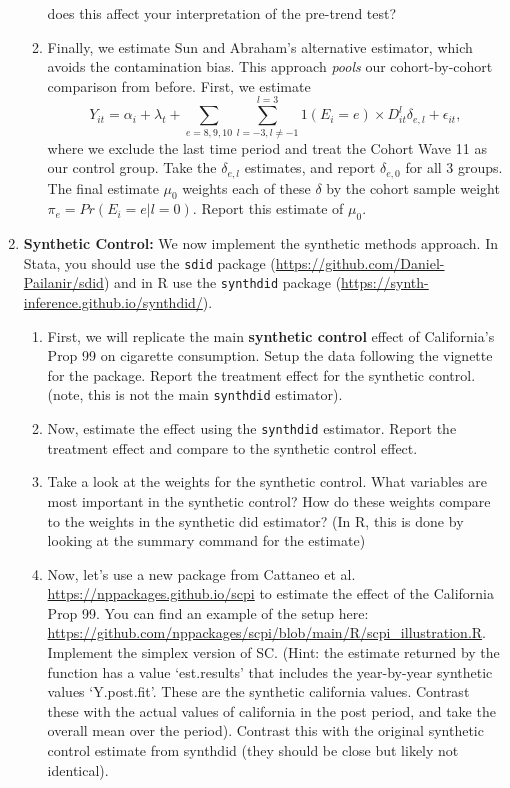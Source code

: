 \documentclass[11pt, a4paper]{article}
\begin{document}
\begin{enumerate}
\begin{enumerate}
        does this affect your interpretation of the pre-trend test?
      \item Finally, we estimate Sun and Abraham's alternative estimator,
        which avoids the contamination bias. This approach \emph{pools}
        our cohort-by-cohort comparison from before. First, we estimate
        \begin{equation}
          Y_{it} = \alpha_{i} + \lambda_{t} + \sum_{e = 8,9,10} \sum_{l =-3, l \not=-1}^{l=3} 1(E_{i} = e) \times D^{l}_{it}\delta_{e,l} + \epsilon_{it},
        \end{equation}
        where we exclude the last time period and treat the Cohort Wave 11
        as our control group. Take the $\delta_{e,l}$ estimates, and
        report $\delta_{e,0}$ for all 3 groups. The final estimate
        $\mu_{0}$ weights each of these $\delta$ by the cohort sample
        weight $\pi_{e} = Pr(E_{i} = e | l = 0)$. Report this estimate of
        $\mu_{0}$.
      \end{enumerate}
    \item \textbf{Synthetic Control:} We now implement the synthetic methods approach. In Stata, you should use the \texttt{sdid} package (\url{https://github.com/Daniel-Pailanir/sdid}) and in R use the \texttt{synthdid} package (\url{https://synth-inference.github.io/synthdid/}). 
    \begin{enumerate}
    \item First, we will replicate the main \textbf{synthetic control} effect of California's Prop 99 on cigarette consumption. Setup the data following the vignette for the package. Report the treatment effect for the synthetic control. (note, this is not the main \texttt{synthdid} estimator). 
    \item Now, estimate the effect using the \texttt{synthdid} estimator. Report the treatment effect and compare to the synthetic control effect.
    \item Take a look at the weights for the synthetic control. What variables are most important in the synthetic control? How do these weights compare to the weights in the synthetic did estimator? (In R, this is done by looking at the summary command for the estimate)
    \item Now, let's use a new package from Cattaneo et al. \url{https://nppackages.github.io/scpi} to estimate the effect of the California Prop 99. You can find an example of the setup here: \url{https://github.com/nppackages/scpi/blob/main/R/scpi_illustration.R}. Implement the simplex version of SC. (Hint: the estimate returned by the function has a value `est.results' that includes the year-by-year synthetic values `Y.post.fit'. These are the synthetic california values. Contrast these with the actual values of california in the post period, and take the overall mean over the period). Contrast this with the original synthetic control estimate from synthdid (they should be close but likely not identical). 

\end{enumerate}
\end{enumerate}
\end{document}
